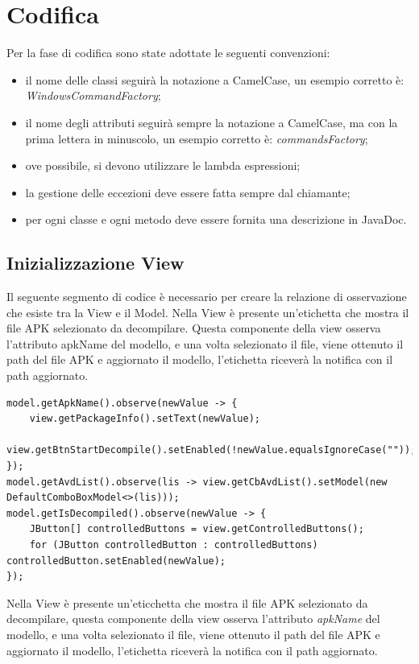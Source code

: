 \newpage
\section{Codifica}\label{sec:codifica}
Per la fase di codifica sono state adottate le seguenti convenzioni:
\begin{itemize}
    \item il nome delle classi seguirà la notazione a CamelCase, un esempio corretto è: \textit{WindowsCommandFactory};
    \item il nome degli attributi seguirà sempre la notazione a CamelCase, ma con la prima lettera in minuscolo, un esempio corretto è: \textit{commandsFactory};
    \item ove possibile, si devono utilizzare le lambda espressioni;
    \item la gestione delle eccezioni deve essere fatta sempre dal chiamante;
    \item per ogni classe e ogni metodo deve essere fornita una descrizione in JavaDoc.
\end{itemize}
\subsection{Inizializzazione View}\label{subsec:inizializzazione-view}
Il seguente segmento di codice è necessario per creare  la relazione di osservazione che esiste tra la View e il Model.
Nella View è presente un'etichetta che mostra il file APK selezionato da decompilare.
Questa componente della view osserva l'attributo apkName del modello, e una volta selezionato il file, viene ottenuto il path del file APK e aggiornato il modello, l'etichetta riceverà la notifica con il path aggiornato.

\begin{lstlisting}[caption={Inizializzazione relazione di osservazione View e Model},label={lst:lstlisting}]
model.getApkName().observe(newValue -> {
    view.getPackageInfo().setText(newValue);
    view.getBtnStartDecompile().setEnabled(!newValue.equalsIgnoreCase(""));
});
model.getAvdList().observe(lis -> view.getCbAvdList().setModel(new DefaultComboBoxModel<>(lis)));
model.getIsDecompiled().observe(newValue -> {
    JButton[] controlledButtons = view.getControlledButtons();
    for (JButton controlledButton : controlledButtons) controlledButton.setEnabled(newValue);
});
\end{lstlisting}
Nella View è presente un'eticchetta che mostra il file APK selezionato da decompilare, questa componente della view osserva l'attributo \textit{apkName} del modello, e una volta selezionato il file, viene ottenuto il path del file APK e aggiornato il modello, l'etichetta riceverà la notifica con il path aggiornato.

